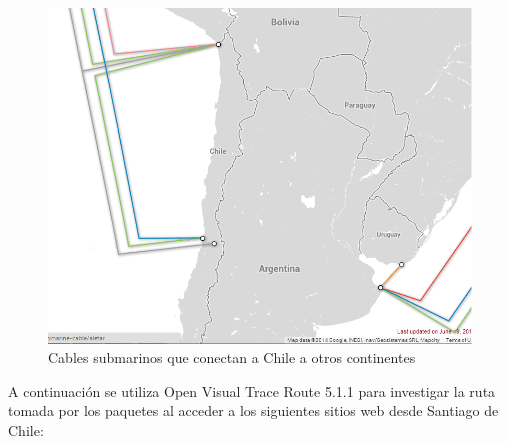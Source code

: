 \documentclass{article}
\begin{document}
\begin{figure}[h!]
\centering
\includegraphics[scale=0.4]{fiber_chile.png}
\caption{Cables submarinos que conectan a Chile a otros continentes}
\label{fig:cables submarinos}
\end{figure}

A continuación se utiliza Open Visual Trace Route 5.1.1 para investigar la ruta tomada por los paquetes al acceder a los siguientes sitios web desde Santiago de Chile:
\end{document}
